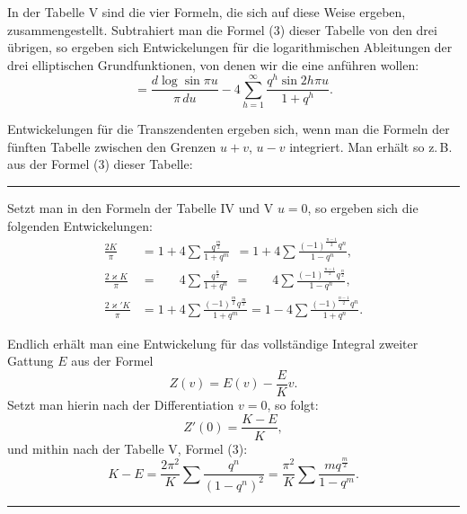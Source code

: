 In der Tabelle V sind die vier Formeln, die sich auf diese Weise ergeben, zusammengestellt. Subtrahiert man die Formel (3) dieser Tabelle von den drei übrigen, so ergeben sich Entwickelungen für die logarithmischen Ableitungen der drei elliptischen Grundfunktionen, von denen wir die eine anführen wollen:
\[
= \frac{d\log\sin\pi u}{\pi\,du} - 4\sum_{h=1}^{\infty}\frac{q^h\sin 2h\pi u}{1+q^h}.
\]

Entwickelungen für die Transzendenten  ergeben sich, wenn man die Formeln der fünften Tabelle zwischen den Grenzen $u+v$, $u-v$ integriert. Man erhält so z.\,B. aus der Formel (3) dieser Tabelle:

\begin{center}
\rule{2cm}{0.4pt}
\end{center}

Setzt man in den Formeln der Tabelle IV und V $u=0$, so ergeben sich die folgenden Entwickelungen:
\[
\begin{aligned}
\frac{2K}{\pi} &= 1+4\sum\frac{q^{\frac{m}{2}}}{1+q^m} \phantom{,} = 1+4\sum\frac{(-1)^{\frac{n-1}{2}}q^n}{1-q^n}, \\
\frac{2\varkappa K}{\pi} &= \phantom{1+{}} 4\sum\frac{q^{\frac{n}{2}}}{1+q^n} \phantom{,} = \phantom{1+{}} 4\sum\frac{(-1)^{\frac{n-1}{2}}q^{\frac{n}{2}}}{1-q^n}, \\
\frac{2\varkappa'K}{\pi} &= 1+4\sum\frac{(-1)^{\frac{m}{2}}q^{\frac{m}{2}}}{1+q^m} = 1-4\sum\frac{(-1)^{\frac{n-1}{2}}q^n}{1+q^n}.
\end{aligned}
\]

Endlich erhält man eine Entwickelung für das vollständige Integral zweiter Gattung $E$ aus der Formel
\[
Z(v) = E(v) - \frac{E}{K}v.
\]
Setzt man hierin nach der Differentiation $v=0$, so folgt:
\[
Z'(0) = \frac{K-E}{K},
\]
und mithin nach der Tabelle V, Formel (3):
\[
K-E = \frac{2\pi^2}{K}\sum\frac{q^n}{(1-q^n)^2} = \frac{\pi^2}{K}\sum\frac{mq^{\frac{m}{2}}}{1-q^m}.
\]

\begin{center}
\rule{2.8cm}{0.4pt}
\end{center}
